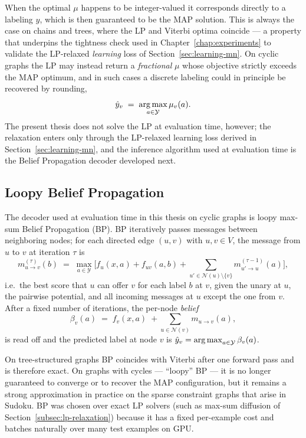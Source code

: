 When the optimal $\mu$ happens to be integer-valued it corresponds
directly to a labeling $y$, which is then guaranteed to be the MAP
solution. This is always the case on chains and trees, where the LP
and Viterbi optima coincide --- a property that underpins the
tightness check used in Chapter~\ref{chap:experiments} to validate
the LP-relaxed \emph{learning} loss of
Section~\ref{sec:learning-mn}. On cyclic graphs the LP may instead
return a \emph{fractional} $\mu$ whose objective strictly exceeds
the MAP optimum, and in such cases a discrete labeling could in
principle be recovered by rounding,
\begin{equation}
    \hat{y}_v \;=\; \operatorname*{arg\,max}_{a \in \mathcal{Y}} \mu_v(a).
    \label{eq:lp-rounding}
\end{equation}
The present thesis does not solve the LP at evaluation time,
however; the relaxation enters only through the LP-relaxed
learning loss derived in Section~\ref{sec:learning-mn}, and the
inference algorithm used at evaluation time is the Belief
Propagation decoder developed next.

\subsection{Loopy Belief Propagation}
\label{subsec:belief-propagation}

The decoder used at evaluation time in this thesis on cyclic graphs
is loopy max-sum Belief Propagation (BP). BP iteratively passes
messages between neighboring nodes; for each directed edge
$(u, v)$ with $u, v \in V$, the message from $u$ to $v$ at
iteration $\tau$ is
\begin{equation}
    m^{(\tau)}_{u \to v}(b) \;=\;
    \max_{a \in \mathcal{Y}}\!\Biggl[
        f_u(x, a) + f_{uv}(a, b)
        + \!\!\!\sum_{u' \in \mathcal{N}(u) \setminus \{v\}}\!\!\!
        m^{(\tau-1)}_{u' \to u}(a)
    \Biggr],
    \label{eq:bp-update}
\end{equation}
i.e.\ the best score that $u$ can offer $v$ for each label $b$ at
$v$, given the unary at $u$, the pairwise potential, and all
incoming messages at $u$ except the one from $v$. After a fixed
number of iterations, the per-node \emph{belief}
\begin{equation}
    \beta_v(a) \;=\; f_v(x, a)
    \;+\!\!\!\sum_{u \in \mathcal{N}(v)}\!\!\! m_{u \to v}(a),
    \label{eq:bp-belief}
\end{equation}
is read off and the predicted label at node $v$ is
$\hat{y}_v = \operatorname*{arg\,max}_{a \in \mathcal{Y}} \beta_v(a)$.

On tree-structured graphs BP coincides with Viterbi after one
forward pass and is therefore exact. On graphs with cycles ---
``loopy'' BP --- it is no longer guaranteed to converge or to
recover the MAP configuration, but it remains a strong
approximation in practice on the sparse constraint graphs that
arise in Sudoku. BP was chosen over exact LP solvers (such as
max-sum diffusion of Section~\ref{subsec:lp-relaxation}) because
it has a fixed per-example cost and batches naturally over many
test examples on GPU.
